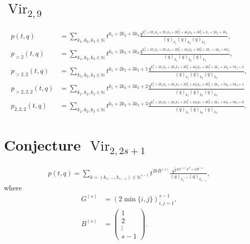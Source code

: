 \documentclass[a4paper, 12pt, reqno]{amsart}
\DeclareMathOperator{\Vir}{Vir}
\begin{document}
\section{$\Vir_{2, 9}$}
\label{sec:vir_2-9}

\begin{align*}
  p(t, q) &= \sum_{k_1, k_2, k_3 \in \mathbb{N}}t^{k_1 + 2k_2 + 3k_3}\frac{q^{k_1^2 + 2k_1k_2 + 2k_1k_3 + 2k_2^2 + 4k_2k_3 + 3k_3^2 + k_1 + 2k_2 + 3k_3}}{(q)_{k_1}(q)_{k_2}(q)_{k_3}}, \\
  p_{>2}(t, q) &= \sum_{k_1, k_2, k_3 \in \mathbb{N}}t^{k_1 + 2k_2 + 3k_3}\frac{q^{k_1^2 + 2k_1k_2 + 2k_1k_3 + 2k_2^2 + 4k_2k_3 + 3k_3^2 + 2k_1 + 4k_2 + 6k_3}}{(q)_{k_1}(q)_{k_2}(q)_{k_3}}, \\
  p_{>2, 2}(t, q) &= \sum_{k_1, k_2, k_3 \in \mathbb{N}}t^{k_1 + 2k_2 + 3k_3 + 1}\frac{q^{k_1^2 + 2k_1k_2 + 2k_1k_3 + 2k_2^2 + 4k_2k_3 + 3k_3^2 + 2k_1 + 4k_2 + 7k_3 + 2}}{(q)_{k_1}(q)_{k_2}(q)_{k_3}}, \\
  p_{>2, 2, 2}(t, q) &= \sum_{k_1, k_2, k_3 \in \mathbb{N}}t^{k_1 + 2k_2 + 3k_3 + 2}\frac{q^{k_1^2 + 2k_1k_2 + 2k_1k_3 + 2k_2^2 + 4k_2k_3 + 3k_3^2 + 2k_1 + 5k_2 + 8k_3 + 4}}{(q)_{k_1}(q)_{k_2}(q)_{k_3}} \\
  p_{2, 2, 2}(t, q) &= \sum_{k_1, k_2, k_3 \in \mathbb{N}}t^{k_1 + 2k_2 + 3k_3 + 3}\frac{q^{k_1^2 + 2k_1k_2 + 2k_1k_3 + 2k_2^2 + 4k_2k_3 + 3k_3^2 + 3k_1 + 6k_2 + 9k_3 + 6}}{(q)_{k_1}(q)_{k_2}(q)_{k_3}}.
\end{align*}

\section{Conjecture $\Vir_{2, 2s + 1}$}
\label{sec:conjecture}

\begin{align*}
  p(t, q) = \sum_{k = (k_1, \dots, k_{s - 1}) \in \mathbb{N}^{s - 1}}t^{2kB^{(s)}}\frac{q^{\frac{1}{2}kG^{(s)}k^T + kB^{(s)}}}{(q)_{k_1}\dots (q)_{k_{s - 1}}},
\end{align*}
where
\begin{align*}
  G^{(s)} &= (2\min\{i, j\})_{i, j = 1}^{s - 1}, \\
  B^{(s)} &=
            \left(\begin{smallmatrix}
                    1 \\
                    2 \\
                    \vdots \\
                    s - 1
                  \end{smallmatrix}\right).
\end{align*}
\end{document}
